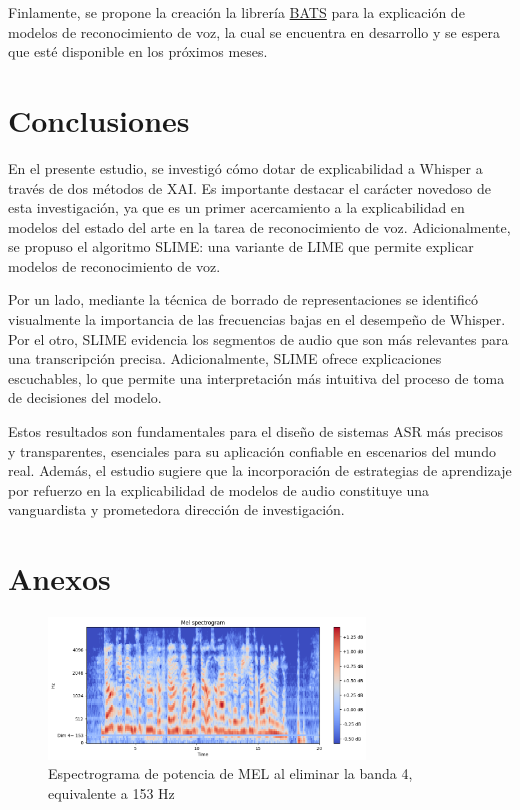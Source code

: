 \documentclass[conference]{IEEEtran}
\begin{document}
Finlamente, se propone la creación la librería \href{https://github.com/diegoquezadac/BATS}{BATS} para la explicación de modelos de reconocimiento de voz, la cual se encuentra en desarrollo y se espera que esté disponible en los próximos meses.

\section{Conclusiones} \label{8-Conclusions}

En el presente estudio, se investigó cómo dotar de explicabilidad a Whisper a través de dos métodos de XAI. Es importante destacar el carácter novedoso de esta investigación, ya que es un primer acercamiento a la explicabilidad en modelos del estado del arte en la tarea de reconocimiento de voz. Adicionalmente, se propuso el algoritmo SLIME: una variante de LIME que permite explicar modelos de reconocimiento de voz.

Por un lado, mediante la técnica de borrado de representaciones se identificó visualmente la importancia de las frecuencias bajas en el desempeño de Whisper. Por el otro, SLIME evidencia los segmentos de audio que son más relevantes para una transcripción precisa. Adicionalmente, SLIME ofrece explicaciones escuchables, lo que permite una interpretación más intuitiva del proceso de toma de decisiones del modelo.

Estos resultados son fundamentales para el diseño de sistemas ASR más precisos y transparentes, esenciales para su aplicación confiable en escenarios del mundo real. Además, el estudio sugiere que la incorporación de estrategias de aprendizaje por refuerzo en la explicabilidad de modelos de audio constituye una vanguardista y prometedora dirección de investigación.

\printbibliography

\section{Anexos} \label{9-Anexos}
\begin{figure}[h]
\centering
\includegraphics[width=0.75\textwidth]{images/dim_4_erasured.png}
\caption{Espectrograma de potencia de MEL al eliminar la banda 4, equivalente a 153 Hz}
\end{figure}
\end{document}
